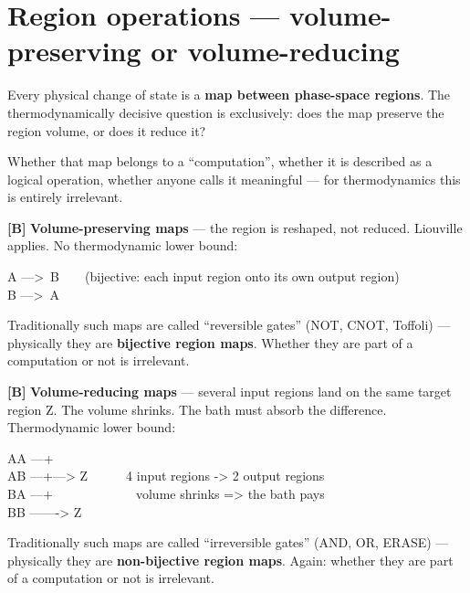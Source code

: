 \section{Region operations --- volume-preserving or volume-reducing}
\label{sec:regionops}

Every physical change of state is a \textbf{map between phase-space regions}. The
thermodynamically decisive question is exclusively: does the map preserve the
region volume, or does it reduce it?

Whether that map belongs to a “computation”, whether it is described as a logical
operation, whether anyone calls it meaningful --- for thermodynamics this is
entirely irrelevant.

\textbf{[B]} \textbf{Volume-preserving maps} --- the region is reshaped, not reduced.
Liouville applies. No thermodynamic lower bound:

\begin{center}
\begin{minipage}{0.78\textwidth}
\ttfamily\small
A --->\ B\ \ \ \ (bijective: each input region onto its own output region)\\
B --->\ A
\end{minipage}
\end{center}

Traditionally such maps are called “reversible gates” (NOT, CNOT, Toffoli) ---
physically they are \textbf{bijective region maps}. Whether they are part of a
computation or not is irrelevant.

\textbf{[B]} \textbf{Volume-reducing maps} --- several input regions land on the same
target region Z. The volume shrinks. The bath must absorb the difference.
Thermodynamic lower bound:

\begin{center}
\begin{minipage}{0.78\textwidth}
\ttfamily\small
AA ---+\\
AB ---+---> Z\ \ \ \ \ \ 4 input regions -> 2 output regions\\
BA ---+\ \ \ \ \ \ \ \ \ \ \ \ \ volume shrinks => the bath pays\\
BB -------> Z
\end{minipage}
\end{center}

Traditionally such maps are called “irreversible gates” (AND, OR, ERASE) ---
physically they are \textbf{non-bijective region maps}. Again: whether they are
part of a computation or not is irrelevant.

